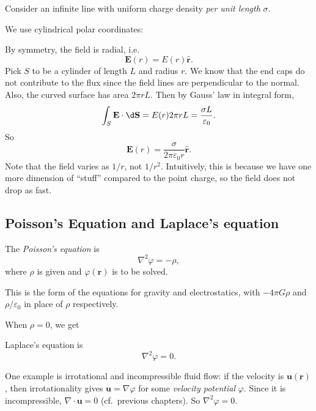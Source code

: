 \documentclass[a4paper]{article}
\begin{document}
\begin{eg}
  Consider an infinite line with uniform charge density \emph{per unit length} $\sigma$.

  We use cylindrical polar coordinates:
  \begin{center}
  \end{center}
  By symmetry, the field is radial, i.e.
  \[
    \mathbf{E}(r) = E(r) \hat{\mathbf{r}}.
  \]
  Pick $S$ to be a cylinder of length $L$ and radius $r$. We know that the end caps do not contribute to the flux since the field lines are perpendicular to the normal. Also, the curved surface has area $2\pi r L$. Then by Gauss' law in integral form,
  \[
    \int_S\mathbf{E}\cdot \d \mathbf{S} = E(r)2\pi rL = \frac{\sigma L}{\varepsilon_0}.
  \]
  So
  \[
    \mathbf{E}(r) = \frac{\sigma}{2\pi \varepsilon_0 r} \hat{\mathbf{r}}.
  \]
  Note that the field varies as $1/r$, not $1/r^2$. Intuitively, this is because we have one more dimension of ``stuff'' compared to the point charge, so the field does not drop as fast.
\end{eg}

\subsection{Poisson's Equation and Laplace's equation}
\begin{defi}
  The \emph{Poisson's equation} is
  \[
    \nabla^2 \varphi = -\rho,
  \]
  where $\rho$ is given and $\varphi(\mathbf{r})$ is to be solved.
\end{defi}
This is the form of the equations for gravity and electrostatics, with $-4\pi G \rho$ and $\rho/\varepsilon_0$ in place of $\rho$ respectively.

When $\rho = 0$, we get
\begin{defi}
  Laplace's equation is
  \[
    \nabla^2 \varphi = 0.
  \]
\end{defi}
One example is irrotational and incompressible fluid flow: if the velocity is $\mathbf{u}(\mathbf{r})$, then irrotationality gives $\mathbf{u} = \nabla \varphi$ for some \emph{velocity potential} $\varphi$. Since it is incompressible, $\nabla\cdot \mathbf{u} = 0$ (cf.\ previous chapters). So $\nabla^2 \varphi = 0$.
\end{document}
